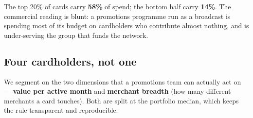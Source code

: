 \documentclass[
]{article}
\begin{document}
The top 20\% of cards carry \textbf{58\%} of spend; the bottom half
carry \textbf{14\%}. The commercial reading is blunt: a promotions
programme run as a broadcast is spending most of its budget on
cardholders who contribute almost nothing, and is under-serving the
group that funds the network.

\subsection{Four cardholders, not one}\label{four-cardholders-not-one}

We segment on the two dimensions that a promotions team can actually act
on --- \textbf{value per active month} and \textbf{merchant breadth}
(how many different merchants a card touches). Both are split at the
portfolio median, which keeps the rule transparent and reproducible.
\end{document}
